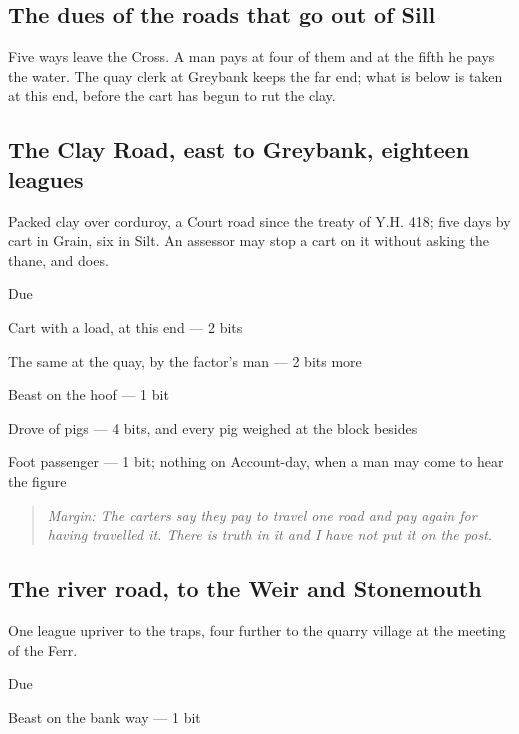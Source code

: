\documentclass{design/chronicle}
\begin{document}
\subsection*{The dues of the roads that go out of Sill}

Five ways leave the Cross. A man pays at four of them and at the fifth he pays the water. The quay clerk at Greybank keeps the far end; what is below is taken at this end, before the cart has begun to rut the clay.

\subsection*{The Clay Road, east to Greybank, eighteen leagues}

Packed clay over corduroy, a Court road since the treaty of Y.H. 418; five days by cart in Grain, six in Silt. An assessor may stop a cart on it without asking the thane, and does.

Due\par

Cart with a load, at this end — 2 bits\par

The same at the quay, by the factor’s man — 2 bits more\par

Beast on the hoof — 1 bit\par

Drove of pigs — 4 bits, and every pig weighed at the block besides\par

Foot passenger — 1 bit; nothing on Account-day, when a man may come to hear the figure\par

\begin{quote}\itshape \emph{Margin:} The carters say they pay to travel one road and pay again for having travelled it. There is truth in it and I have not put it on the post.\end{quote}

\subsection*{The river road, to the Weir and Stonemouth}

One league upriver to the traps, four further to the quarry village at the meeting of the Ferr.

Due\par

Beast on the bank way — 1 bit\par
\end{document}
